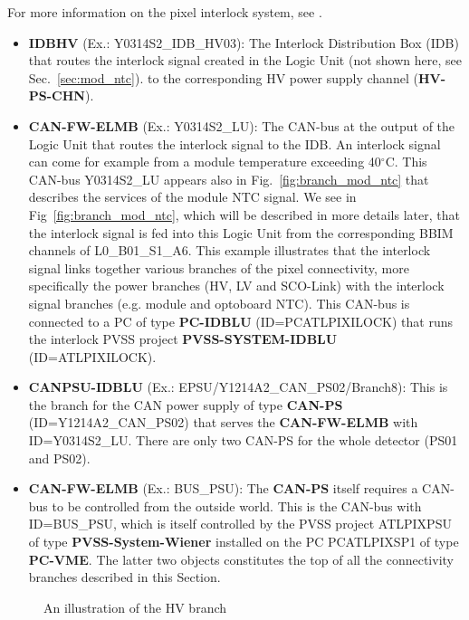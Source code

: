 For more information on the pixel interlock system, see \cite{ilock_matrix}.
%
\begin{itemize}
\item {\bf IDBHV} (Ex.: Y0314S2\_IDB\_HV03): The Interlock Distribution Box (IDB) that routes the interlock signal
created in the Logic Unit (not shown here, see Sec.~\ref{sec:mod_ntc}).
to the corresponding HV power supply channel ({\bf HV-PS-CHN}). 
\item {\bf CAN-FW-ELMB} (Ex.: Y0314S2\_LU): The CAN-bus at the output of the Logic Unit that routes the interlock
signal to the IDB. An interlock signal can come for example from a module temperature exceeding 40$^\circ$C. 
This CAN-bus Y0314S2\_LU appears also in Fig.~\ref{fig:branch_mod_ntc} that describes the services of 
the module NTC signal. We see in Fig~\ref{fig:branch_mod_ntc}, which will be
described in more details later, that the interlock signal is fed into this Logic Unit from the
corresponding BBIM channels of L0\_B01\_S1\_A6. This example illustrates that the interlock
signal links together various branches of the pixel connectivity, more specifically the power branches (HV, LV and SCO-Link)
with the interlock signal branches (e.g. module and optoboard NTC). This CAN-bus is connected to a
PC of type {\bf PC-IDBLU} (ID=PCATLPIXILOCK) that runs the interlock PVSS project {\bf PVSS-SYSTEM-IDBLU}
(ID=ATLPIXILOCK).
\item {\bf CANPSU-IDBLU} (Ex.: EPSU/Y1214A2\_CAN\_PS02/Branch8): This is the branch for the CAN power supply
of type {\bf CAN-PS} (ID=Y1214A2\_CAN\_PS02) that serves the {\bf CAN-FW-ELMB} with ID=Y0314S2\_LU. There are only two CAN-PS for
the whole detector (PS01 and PS02).
\item {\bf CAN-FW-ELMB} (Ex.: BUS\_PSU): The {\bf CAN-PS} itself requires a CAN-bus to be controlled from the outside
world. This is the CAN-bus with ID=BUS\_PSU,
which is itself controlled by the PVSS project ATLPIXPSU of type {\bf PVSS-System-Wiener} installed
on the PC PCATLPIXSP1 of type {\bf PC-VME}. The latter two objects constitutes the top of all the connectivity
branches described in this Section.
\end{itemize}

\begin{figure}
\begin{center}
\end{center}
\caption{An illustration of the HV branch}
\label{fig:branch_hv}
\end{figure}

